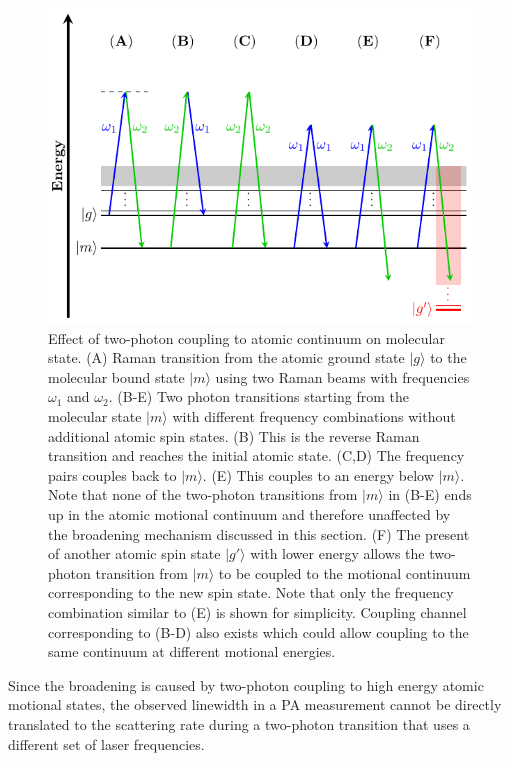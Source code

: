 \begin{figure}
  \centering
  \includegraphics[width=\textwidth]{figures/pa_two_photon_down_raman.pdf}
  \caption[Two-photon transition from molecular state.]{
    Effect of two-photon coupling to atomic continuum on molecular state.
    (A) Raman transition from the atomic ground state $|g\rangle$
    to the molecular bound state $|m\rangle$ using two Raman beams with frequencies
    $\omega_1$ and $\omega_2$.
    (B-E) Two photon transitions starting from the molecular state $|m\rangle$
    with different frequency combinations without additional atomic spin states.
    (B) This is the reverse Raman transition and reaches the initial atomic state.
    (C,D) The frequency pairs couples back to $|m\rangle$.
    (E) This couples to an energy below $|m\rangle$.
    Note that none of the two-photon transitions from $|m\rangle$ in (B-E) ends up in
    the atomic motional continuum and therefore unaffected by the broadening mechanism
    discussed in this section.
    (F) The present of another atomic spin state $|g'\rangle$ with lower energy
    allows the two-photon transition from $|m\rangle$ to be coupled to the
    motional continuum corresponding to the new spin state.
    Note that only the frequency combination similar to (E) is shown for simplicity.
    Coupling channel corresponding to (B-D) also exists which could allow coupling
    to the same continuum at different motional energies.
    \label{fig:pa:linewidth:two-photon-down-raman}}
\end{figure}

Since the broadening is caused by two-photon coupling to high energy atomic motional states,
the observed linewidth in a PA measurement cannot be directly translated to
the scattering rate during a two-photon transition that uses a different set of laser frequencies.

